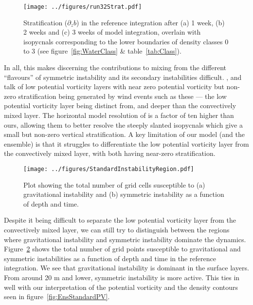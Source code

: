 \begin{figure}[t]
    \centering
    \texttt{[image: ../figures/run32Strat.pdf]}
    \caption{Stratification ($\partial_z b$) in the reference integration after (a) 1 week, (b) 2 weeks and (c) 3 weeks of model integration, overlain with isopycnals corresponding to the lower boundaries of density classes 0 to 3 (see figure~\ref{fig:WaterClass} \& table~\ref{tab:Class}).}
    \label{fig:EnsStandardStrat}
\end{figure}

In all, this makes discerning the contributions to mixing from the different ``flavours'' of symmetric instability and its secondary instabilities difficult. \citet{Taylor2010}, and \citet{Yu2021} talk of low potential vorticity layers with near zero potential vorticity but non-zero stratification being generated by wind events such as these --- the low potential vorticity layer being distinct from, and deeper than the convectively mixed layer. The horizontal model resolution of \citet{Taylor2010} is a factor of ten higher than ours, allowing them to better resolve the steeply slanted isopycnals which give a small but non-zero vertical stratification. A key limitation of our model (and the ensemble) is that it struggles to differentiate the low potential vorticity layer from the convectively mixed layer, with both having near-zero stratification.

\begin{figure}[t]
    \centering
    \texttt{[image: ../figures/StandardInstabilityRegion.pdf]}
    \caption{Plot showing the total number of grid cells susceptible to (a) gravitational instability and (b) symmetric instability as a function of depth and time.}
    \label{fig:GravVsSym}
\end{figure}

Despite it being difficult to separate the low potential vorticity layer from the convectively mixed layer, we can still try to distinguish between the regions where gravitational instability and symmetric instability dominate the dynamics. Figure~\ref{fig:GravVsSym} shows the total number of grid points susceptible to gravitational and symmetric instabilities as a function of depth and time in the reference integration. We see that gravitational instability is dominant in the surface layers. From around 20 m and lower, symmetric instability is more active. This ties in well with our interpretation of the potential vorticity and the density contours seen in figure~\ref{fig:EnsStandardPV}.


